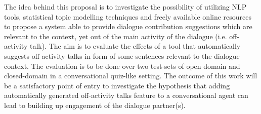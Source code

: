 The idea behind this proposal is to investigate the possibility of utilizing NLP tools, statistical topic modelling techniques and freely available online resources to propose a system able to provide dialogue contribution suggestions which are relevant to the context, yet out of the main activity of the dialogue (i.e. off-activity talk). The aim is to evaluate the effects of a tool that automatically suggests off-activity talks in form of some sentences relevant to the dialogue context. The evaluation is to be done over two test-sets of open domain and closed-domain in a conversational quiz-like setting. The outcome of this work will be a satisfactory point of entry to investigate the hypothesis that adding automatically generated off-activity talks feature to a conversational agent can lead to building up engagement of the dialogue partner(s).
